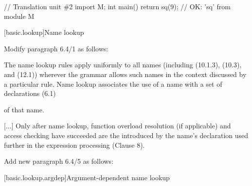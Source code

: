 \begin{extract*}
\begin{std.txt}
\begin{codeblock}
    // Translation unit \#2
    import M;
    int main() { return sq(9); }       // OK: 'sq' from module M
    \end{codeblock}
    \exitexample
\end{std.txt}


\setcounter{section}{3}
[basic.lookup]{Name lookup}

Modify paragraph 6.4/1 as follows:
\begin{std.txt}
  \resetalinea[0]
  \alinea
  The name lookup rules apply uniformly to all names
  (including  (10.1.3),
   (10.3), and 
   (12.1))
  wherever the grammar allows such names in the context discussed by a 
  particular rule.
  Name lookup associates the use of a name with a set of declarations (6.1)
\begin{undecided}
\end{undecided}
  of that name.
\begin{undecided}
\end{undecided}
  [...] Only after name lookup, function overload resolution (if applicable)
  and access checking have succeeded are the
   introduced by the name's
  declaration used further in the expression processing (Clause 8).
\end{std.txt}

\begin{before}
Add new paragraph 6.4/5 as follows:
\begin{std.txt}\color{addclr}
  \resetalinea[4]
  \alinea
\end{std.txt}
\end{before}

\setcounter{subsection}{1}
[basic.lookup.argdep]{Argument-dependent name lookup}


\end{extract*}

